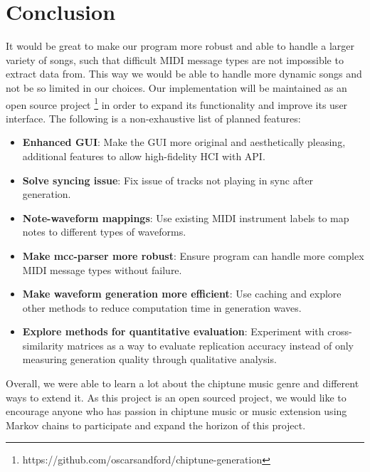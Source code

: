 \documentclass{article}
\begin{document}
\section{Conclusion} 
It would be great to make our program more robust and able to handle a larger variety of songs, such that difficult MIDI message types are not impossible to extract
data from. This way we would be able to handle more dynamic songs and not be so limited in our choices. Our implementation will be maintained as an open source 
project \footnote{https://github.com/oscarsandford/chiptune-generation} in order to expand its functionality and improve its user interface. The following is a non-exhaustive 
list of planned features:
\begin{itemize}
  \item \textbf{Enhanced GUI}: Make the GUI more original and aesthetically pleasing, additional features to allow high-fidelity HCI with API.
  \item \textbf{Solve syncing issue}: Fix issue of tracks not playing in sync after generation.
  \item \textbf{Note-waveform mappings}: Use existing MIDI instrument labels to map notes to different types of waveforms.
  \item \textbf{Make mcc-parser more robust}: Ensure program can handle more complex MIDI message types without failure.
  \item \textbf{Make waveform generation more efficient}: Use caching and explore other methods to reduce computation time in generation waves.
  \item \textbf{Explore methods for quantitative evaluation}: Experiment with cross-similarity matrices as a way to evaluate replication accuracy instead of only measuring 
  generation quality through qualitative analysis. 
\end{itemize}
Overall, we were able to learn a lot about the chiptune music genre and different ways to extend it. As this project is an open sourced project, we would like to encourage
anyone who has passion in chiptune music or music extension using Markov chains to participate and expand the horizon of this project.


\end{document}
